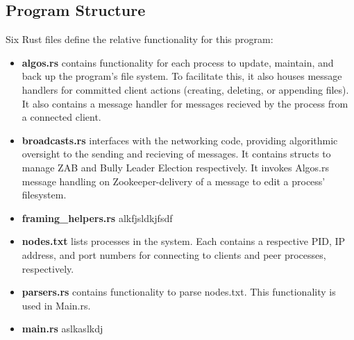 \documentclass{article}
\begin{document}
\subsection*{Program Structure}
    Six Rust files define the relative functionality for this program:
\begin{itemize}
        \item\textbf{algos.rs} contains functionality for each process to update, maintain, and back up the program's file system. To facilitate this, it also houses message handlers for committed client actions (creating, deleting, or appending files). It also contains a message handler for messages recieved by the process from a connected client.
        \item\textbf{broadcasts.rs} interfaces with the networking code, providing algorithmic oversight to the sending and recieving of messages. It contains structs to manage ZAB and Bully Leader Election respectively. It invokes Algos.rs message handling on Zookeeper-delivery of a message to edit a process' filesystem.
        \item\textbf{framing\_helpers.rs} alkfjsldkjfsdf
        \item\textbf{nodes.txt} lists processes in the system. Each contains a respective PID, IP address, and port numbers for connecting to clients and peer processes, respectively.
        \item\textbf{parsers.rs} contains functionality to parse nodes.txt. This functionality is used in Main.rs.
        \item\textbf{main.rs} aslkaslkdj
\end{itemize}
\end{document}
